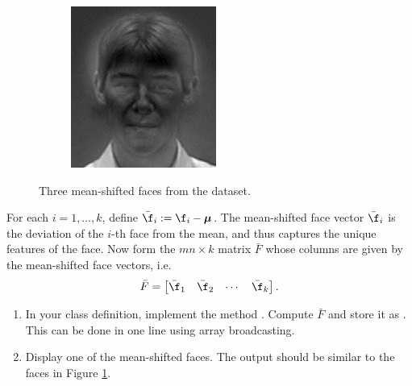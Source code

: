 \begin{figure}
\begin{subfigure}[b]{0.3\textwidth}
\end{subfigure}
\begin{subfigure}[b]{0.3\textwidth}
\includegraphics[width=\textwidth]{differenceFace2.png}
\end{subfigure}
\caption{Three mean-shifted faces from the dataset.}
\label{facialRecognition:differenceFaces}
\end{figure}
For each $i = 1,\ldots, k$, define $\bar{\f}_i := \f_i - {\boldsymbol \mu}$.
The mean-shifted face vector $\bar{\f}_i$ is the deviation of the $i$-th face from the mean, and thus captures the unique features of the face.
Now form the $mn \times k$ matrix $\bar{F}$ whose columns are given by the mean-shifted face vectors, i.e.
\[
\bar{F} = \begin{bmatrix}
\bar{\f}_1 & \bar{\f}_2 & \cdots & \bar{\f}_k
\end{bmatrix}.
\]
\begin{problem}
\leavevmode
\begin{enumerate}
\item In your class definition, implement the method .
Compute $\bar{F}$ and store it as .
This can be done in one line using array broadcasting.
\item
Display one of the mean-shifted faces. 
The output should be similar to the faces in Figure \ref{facialRecognition:differenceFaces}.
\end{enumerate}
\end{problem}


